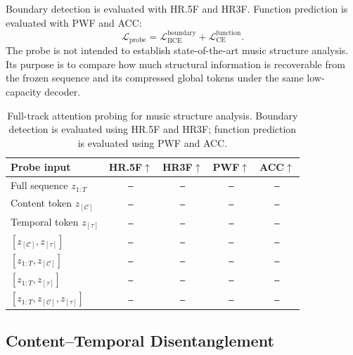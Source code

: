 \documentclass{article}
\newcommand{\zC}{z_{[\mathcal{C}]}}    %
\newcommand{\ztau}{z_{[\tau]}}          %
\newcommand{\res}{\texttt{--}}
\begin{document}
Boundary detection is evaluated with HR.5F and HR3F.  Function
prediction is evaluated with PWF and ACC:
%
\begin{equation}
  \mathcal{L}_{\mathrm{probe}}
  =
  \mathcal{L}_{\mathrm{BCE}}^{\mathrm{boundary}}
  +
  \mathcal{L}_{\mathrm{CE}}^{\mathrm{function}}.
  \label{eq:probe_loss}
\end{equation}
%
The probe is not intended to establish state-of-the-art music
structure analysis.  Its purpose is to compare how much structural
information is recoverable from the frozen sequence and its compressed
global tokens under the same low-capacity decoder.

\begin{table}[t]
  \centering
  \setlength{\tabcolsep}{3.0pt}
  \caption{Full-track attention probing for music structure analysis.  Boundary
    detection is evaluated using HR.5F and HR3F; function prediction is
  evaluated using PWF and ACC.}
  \label{tab:structure_probe}
  \begin{tabular}{lcccc}
    \toprule
    \textbf{Probe input}
    & HR.5F$\uparrow$
    & HR3F$\uparrow$
    & PWF$\uparrow$
    & ACC$\uparrow$ \\
    \midrule
    Full sequence $z_{1:T}$ & \res & \res & \res & \res \\
    Content token $\zC$ & \res & \res & \res & \res \\
    Temporal token $\ztau$ & \res & \res & \res & \res \\
    $[\zC,\ztau]$ & \res & \res & \res & \res \\
    \midrule
    $[z_{1:T},\zC]$ & \res & \res & \res & \res \\
    $[z_{1:T},\ztau]$ & \res & \res & \res & \res \\
    $[z_{1:T},\zC,\ztau]$ & \res & \res & \res & \res \\
    \bottomrule
  \end{tabular}
\end{table}

\subsection{Content--Temporal Disentanglement}
\label{ssec:exp_disentanglement}
\end{document}
